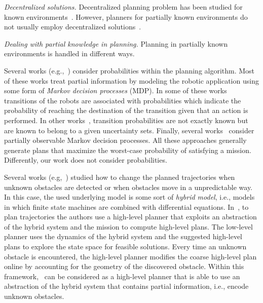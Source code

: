 \emph{Decentralized solutions.}
Decentralized planning problem has been studied for known environments~\cite{schillinger2016decomposition,guo2015multi,tumova2016multi}.
However, planners for partially known environments do not usually employ decentralized solutions~\cite{roy2006planning,du2012robot,diaz2001exploring}. 

\emph{Dealing with partial knowledge in planning.}
Planning in partially known environments is handled in different ways. 
\begin{enumerate*}
\item Several works (e.g.,~\cite{ding2011ltl,kurniawati2011motion,wolff2012robust,du2012robot,Roy2006,chen2012ltl,nikou2017probabilistic,7078886,7139350,narayanan2015task}) consider probabilities within the planning algorithm.
Most of these works  treat partial information by modeling the robotic application using some form of \emph{Markov decision processes} (MDP).
In some of these works~\cite{ding2011ltl,chen2012ltl} transitions of the robots are associated with probabilities which indicate the probability of reaching the destination of the transition given that an action is performed.
In other works~\cite{wolff2012robust}, transition probabilities are not exactly known but are known to belong to a given uncertainty sets.
Finally, several works~\cite{kurniawati2011motion,Roy2006} consider partially observable Markov decision processes.
All these approaches generally generate plans that maximize the worst-case probability of satisfying a mission.
Differently, our work does not consider probabilities.
\item Several works (e.g,~\cite{lahijanian2016iterative,livingston2012backtracking,l2014safety,nie2016searching,7139412}) studied how to change the planned trajectories when unknown obstacles are detected or when obstacles move in a unpredictable way.
In this case, the used underlying model is some sort of \emph{hybrid model}, i.e., models in which finite state machines are combined with differential equations. 
In~\cite{lahijanian2016iterative}, to plan trajectories the authors use a high-level planner that exploits an abstraction of the hybrid system and the mission to compute high-level plans. 
The low-level planner uses the dynamics of the hybrid system and the suggested high-level plans to explore the state space for feasible solutions.
Every time an unknown obstacle is encountered, the high-level planner modifies the coarse high-level plan online by accounting for the geometry of the discovered obstacle. 
Within this framework, \toolName\ can be considered as a high-level planner that is able to use an abstraction of the hybrid system that contains partial information, i.e., encode unknown obstacles.

\end{enumerate*}

